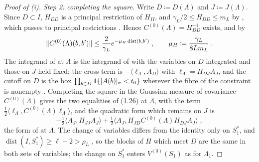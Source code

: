 \documentclass[11pt]{preprint}
\newcommand{\id}{\mathbf 1}
\newcommand{\dist}{\operatorname{dist}}
\DeclarePairedDelimiter{\abs}{\lvert}{\rvert}
\DeclarePairedDelimiter{\norm}{\lVert}{\rVert}
\numberwithin{equation}{section}
\theoremstyle{definition}
\theoremstyle{remark}
\theoremstyle{plain}
\begin{document}
\begin{proof}[Proof of (i)]
\emph{Step 2: completing the square.} Write $D \coloneqq D(\Lambda)$ and $J \coloneqq J(\Lambda)$. Since $D \subset I$, $H_{DD}$ is a principal restriction of $H_{II}$, and $\gamma_L/2 \leq H_{DD} \leq m_L$ by \cite[(I3)]{WilsonFirstStep}, which passes to principal restrictions \cite[Remark~9.11]{WilsonFirstStep}. Hence $C^{(0)}(\Lambda) = H_{DD}^{-1}$ exists, and by \cite[Lemma~9.1]{WilsonFirstStep}
\begin{equation}\label{eq:retreated-decay}
    \norm{C^{(0)}(\Lambda)(b, b')} \leq \frac{2}{\gamma_L}e^{-\mu_H\dist(b, b')}\;,
    \qquad
    \mu_H \coloneqq \frac{\gamma_L}{8Lm_L}\;.
\end{equation}
The integrand of \cite[(1.26)]{BalabanCRE} at $\Lambda$ is the integrand of \cite[(1.15), p.~249]{BalabanCRE} with the variables on $D$ integrated and those on $J$ held fixed; the cross term is $-\langle\ell_\Lambda, A_D\rangle$ with $\ell_\Lambda = H_{DJ}A_J$, and the cutoff on $D$ is the box $\prod_{b \in D}\id\{\abs{A(b)}_\sigma < t_0\}$ wherever the fibre of the constraint is nonempty \cite[Lemma~9.12(iv)]{WilsonFirstStep}. Completing the square in the Gaussian measure of covariance $C^{(0)}(\Lambda)$ gives the two equalities of (1.26) at $\Lambda$, with the term $\frac12\langle\ell_\Lambda, C^{(0)}(\Lambda)\ell_\Lambda\rangle$, and the quadratic form which remains on $J$ is
\begin{equation}\label{eq:retreated-outer-form}
    -\tfrac12\langle A_J, H_{JJ}A_J\rangle + \tfrac12\langle A_J, H_{JD}C^{(0)}(\Lambda)H_{DJ}A_J\rangle\;,
\end{equation}
the form of \cite[(1.29)]{BalabanCRE} at $\Lambda$. The change of variables \cite[(1.22)]{BalabanCRE} differs from the identity only on $S_1^*$, and $\dist(I, S_1^*) \geq \ell - 2 > \rho_L$ \cite[(3.39)]{WilsonFirstStep}, so the blocks of $H$ which meet $D$ are the same in both sets of variables; the change on $S_1^*$ enters $V^{(0)}(S_1)$ as for $\Lambda_1$.


\end{proof}
\end{document}

